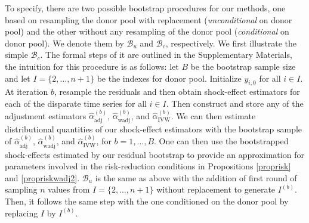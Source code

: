 \documentclass[11pt]{article}
\def\mrm#1{\mathrm{#1}} %
\def\mc#1{\mathcal{#1}} %
\theoremstyle{definition}
\begin{document}
To specify, there are two possible bootstrap procedures for our methods, one based on resampling the donor pool with replacement (\emph{unconditional} on donor pool) and the other without any resampling of the donor pool (\emph{conditional} on donor pool). We denote them by $\mc{B}_u$ and  $\mc{B}_c$, respectively. We first illustrate the simple $\mc{B}_c$. The formal steps of it are outlined in the Supplementary Materials, the intuition for this procedure is as follows: let $B$ be the bootstrap sample size and let $I=\{2, \ldots, n +1\}$ be the indexes for donor pool. Initialize $y_{i,0}$ for all $i \in I$. At iteration $b$, resample the residuals and then obtain shock-effect estimators for each of the disparate time series for all $i \in I$. Then construct and store any of the adjustment estimators $\hat{\alpha}^{(b)}_{\mrm{adj}}$, $\hat{\alpha}^{(b)}_{\mrm{wadj}}$, and $\hat{\alpha}^{(b)}_{\mrm{IVW}}$. We can then estimate distributional quantities of our shock-effect estimators with the bootstrap sample of $\hat{\alpha}^{(b)}_{\mrm{adj}}$, $\hat{\alpha}^{(b)}_{\mrm{wadj}}$, and $\hat{\alpha}^{(b)}_{\mrm{IVW}}$, for $b = 1,\ldots,B$.
One can then use the bootstrapped shock-effects estimated by our residual bootstrap to provide an approximation for parameters involved in the risk-reduction conditions in Propositions \ref{proprisk} and \ref{propriskwadj2}. $\mc{B}_u$ is the same as above with the addition of first round of sampling $n$ values from $I=\{2, \ldots, n+1\}$ without replacement to generate  $I^{(b)}$. Then, it follows the same step with the one conditioned on the donor pool by replacing $I$ by $I^{(b)}$. 

\end{document}
